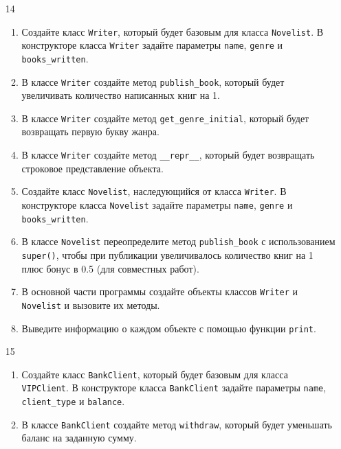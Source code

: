 \begin{enumerate}
\item[14] 
\begin{enumerate}
    \item Создайте класс \texttt{Writer}, который будет базовым для класса \texttt{Novelist}. В конструкторе класса \texttt{Writer} задайте параметры \texttt{name}, \texttt{genre} и \texttt{books\_written}.
    
    \item В классе \texttt{Writer} создайте метод \texttt{publish\_book}, который будет увеличивать количество написанных книг на 1.
    
    \item В классе \texttt{Writer} создайте метод \texttt{get\_genre\_initial}, который будет возвращать первую букву жанра.
    
    \item В классе \texttt{Writer} создайте метод \texttt{\_\_repr\_\_}, который будет возвращать строковое представление объекта.
    
    \item Создайте класс \texttt{Novelist}, наследующийся от класса \texttt{Writer}. В конструкторе класса \texttt{Novelist} задайте параметры \texttt{name}, \texttt{genre} и \texttt{books\_written}.
    
    \item В классе \texttt{Novelist} переопределите метод \texttt{publish\_book} с использованием \texttt{super()}, чтобы при публикации увеличивалось количество книг на 1 плюс бонус в 0.5 (для совместных работ).
    
    \item В основной части программы создайте объекты классов \texttt{Writer} и \texttt{Novelist} и вызовите их методы.
    
    \item Выведите информацию о каждом объекте с помощью функции \texttt{print}.
\end{enumerate}

\item[15] 
\begin{enumerate}
    \item Создайте класс \texttt{BankClient}, который будет базовым для класса \texttt{VIPClient}. В конструкторе класса \texttt{BankClient} задайте параметры \texttt{name}, \texttt{client\_type} и \texttt{balance}.
    
    \item В классе \texttt{BankClient} создайте метод \texttt{withdraw}, который будет уменьшать баланс на заданную сумму.
    

\end{enumerate}
\end{enumerate}
